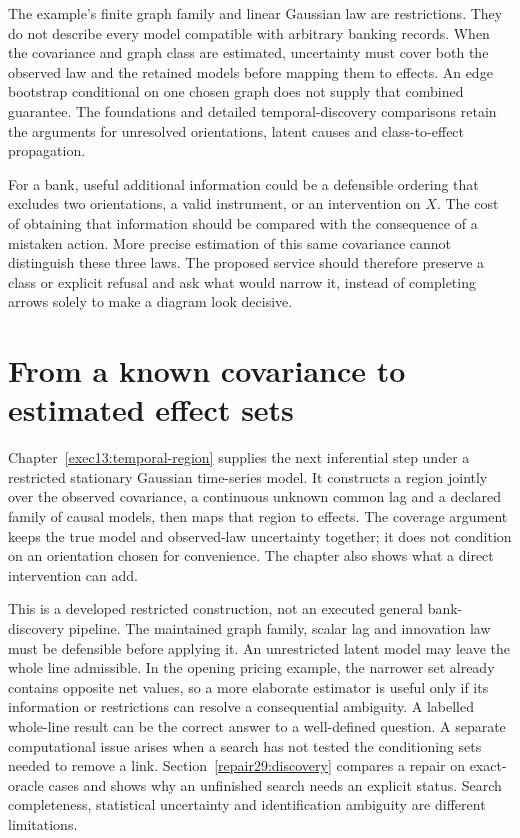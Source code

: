 The example's finite graph family and linear Gaussian law are restrictions.
They do not describe every model compatible with arbitrary banking records.
When the covariance and graph class are estimated, uncertainty must cover
both the observed law and the retained models before mapping them to effects.
An edge bootstrap conditional on one chosen graph does not supply that
combined guarantee. The foundations and detailed temporal-discovery
comparisons retain the arguments for unresolved orientations, latent causes
and class-to-effect propagation.

For a bank, useful additional information could be a defensible ordering
that excludes two orientations, a valid instrument, or an intervention on
$X$. The cost of obtaining that information should be compared with the
consequence of a mistaken action. More precise estimation of this same
covariance cannot distinguish these three laws. The proposed service should
therefore preserve a class or explicit refusal and ask what would narrow it,
instead of completing arrows solely to make a diagram look decisive.

\section{From a known covariance to estimated effect sets}
Chapter~\ref{exec13:temporal-region} supplies the next inferential step under
a restricted stationary Gaussian time-series model. It constructs a region
jointly over the observed covariance, a continuous unknown common lag and a
declared family of causal models, then maps that region to effects. The
coverage argument keeps the true model and observed-law uncertainty together;
it does not condition on an orientation chosen for convenience. The chapter
also shows what a direct intervention can add.

This is a developed restricted construction, not an executed general
bank-discovery pipeline. The maintained graph family, scalar lag and
innovation law must be defensible before applying it. An unrestricted latent
model may leave the whole line admissible. In the opening pricing example,
the narrower set already contains opposite net values, so a more elaborate
estimator is useful only if its information or restrictions can resolve a
consequential ambiguity. A labelled whole-line result can be the correct
answer to a well-defined question. A separate computational issue arises
when a search has not tested the conditioning sets needed to remove a link.
Section~\ref{repair29:discovery} compares a repair on exact-oracle cases and
shows why an unfinished search needs an explicit status. Search completeness,
statistical uncertainty and identification ambiguity are different limitations.


